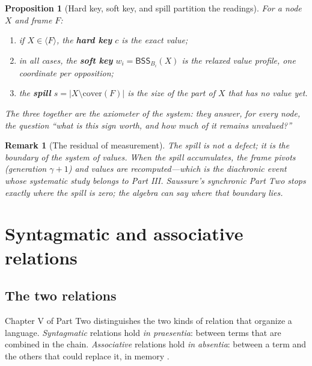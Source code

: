 \documentclass[11pt,a4paper]{article}
\newtheorem{proposition}[principle]{Proposition}
\newtheorem{remark}[principle]{Remark}
\theoremstyle{remark}
\newcommand{\BSS}{\ensuremath{\mathsf{BSS}}}             %
\newcommand{\spanof}[1]{\ensuremath{\langle #1\rangle}}  %
\newcommand{\Gen}{\ensuremath{\gamma}}                   %
\newcommand{\cover}{\ensuremath{\mathrm{cover}}}         %
\begin{document}
\begin{proposition}[Hard key, soft key, and spill partition the readings]
\label{prop:measure}
For a node $X$ and frame $F$:
\begin{enumerate}[leftmargin=*,nosep]
  \item if $X \in \spanof{F}$, the \textbf{hard key} $c$ is the exact value;
  \item in all cases, the \textbf{soft key} $w_i = \BSS_{B_i}(X)$ is the
    relaxed value profile, one coordinate per opposition;
  \item the \textbf{spill} $s = |X \setminus \cover(F)|$ is the size of the
    part of $X$ that has no value yet.
\end{enumerate}
The three together are the axiometer of the system: they answer, for every
node, the question ``what is this sign worth, and how much of it remains
unvalued?''
\end{proposition}

\begin{remark}[The residual of measurement]
The spill is not a defect; it is the boundary of the system of values. When
the spill accumulates, the frame pivots (generation $\Gen+1$) and values are
recomputed---which is the diachronic event whose systematic study belongs to
Part III. Saussure's synchronic Part Two stops exactly where the spill is
zero; the algebra can say where that boundary lies.
\end{remark}

\section{Syntagmatic and associative relations}
\label{sec:relations}

\subsection{The two relations}
\label{sec:two-relations}

Chapter V of Part Two distinguishes the two kinds of relation that organize a
language. \emph{Syntagmatic} relations hold \emph{in praesentia}: between
terms that are combined in the chain. \emph{Associative} relations hold
\emph{in absentia}: between a term and the others that could replace it, in
memory \cite[Part II, ch.~V, \S1]{harris1983}.
\end{document}
